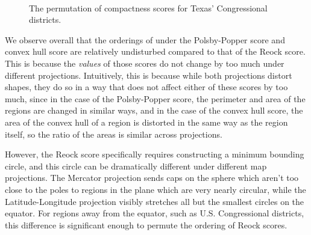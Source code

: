 \begin{figure}[H]
\centering
{} 
\\[1.5em]

\caption{The permutation of compactness scores for Texas' Congressional districts.}
\label{fig:txscores}
\end{figure}




We observe overall that the orderings of under the Polsby-Popper score and convex hull score are relatively undisturbed compared to that of the Reock score.  This is because the \textit{values} of those scores do not change by too much under different projections.  Intuitively, this is because while both projections distort shapes, they do so in a way that does not affect either of these scores by too much, since in the case of the Polsby-Popper score, the perimeter and area of the regions are changed in similar ways, and in the case of the convex hull score, the area of the convex hull of a region is distorted in the same way as the region itself, so the ratio of the areas is similar across projections.

However, the Reock score specifically requires constructing a minimum bounding circle, and this circle can be dramatically different under different map projections.  The Mercator projection sends caps on the sphere which aren't too close to the poles to regions in the plane which are very nearly circular, while the Latitude-Longitude projection visibly stretches all but the smallest circles on the equator.  For regions away from the equator, such as U.S. Congressional districts, this difference is significant enough to permute the ordering of Reock scores.


